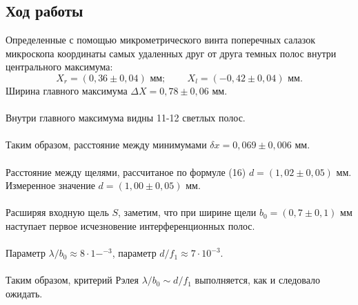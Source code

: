 \documentclass[12pt]{article}
\begin{document}
\subsection{Ход работы}
Определенные с помощью микрометрического винта поперечных салазок микроскопа координаты самых удаленных друг от друга темных полос внутри центрального максимума: \[
		X_r = (0,36 \pm 0,04) \mbox{ мм; } \mbox{ }\mbox{ }\mbox{ } X_l = (-0,42 \pm 0,04) \mbox{ мм.} 
\]
Ширина главного максимума $\Delta X = 0,78 \pm 0,06$ мм. \\
\\
Внутри главного максимума видны 11-12 светлых полос.\\
\\
Таким образом, расстояние между минимумами $\delta x = 0,069 \pm 0,006$ мм. \\
\\
Расстояние между щелями, рассчитаное по формуле (16) $d = (1,02 \pm 0,05)$ мм.\\
Измеренное значение $d = (1,00 \pm 0,05)$ мм.\\
\\
Расширяя входную щель $S$, заметим, что при ширине щели $b_0 = (0,7 \pm 0,1)$ мм наступает первое исчезновение интерференционных полос.\\
\\
Параметр $\lambda/b_0 \approx 8 \cdot 1-^{-3}$, параметр $d/f_1 \approx 7 \cdot 10^{-3}$.\\
\\
Таким образом, критерий Рэлея  $\lambda/b_0 \sim d/f_1$ выполняется, как и следовало ожидать.
\newpage
\end{document}
